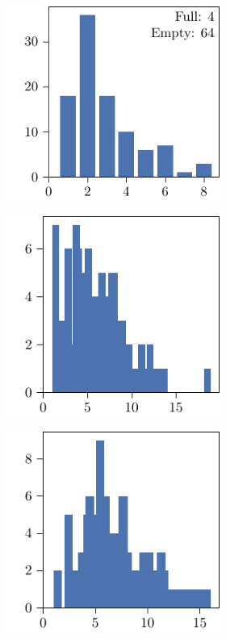 \begin{figure}[p]
\begin{subfigure}{\textwidth}
\begin{subfigure}{\mymultiouter}
          \includegraphics[width=\mymultiinner]{figures/new/relaxed_common-princess-permutation-retraining}
    \end{subfigure}
  \end{subfigure}
  \centering
  \begin{subfigure}{\textwidth}
    \centering
    \begin{subfigure}{\mymultiouter}
        \centering
          \includegraphics[width=\mymultiinner]{figures/new/eucledian-princess-qlibra-permutation}
    \end{subfigure}
    \begin{subfigure}{\mymultiouter}
        \centering
          \includegraphics[width=\mymultiinner]{figures/new/eucledian-princess-qlibra-retraining}

\end{subfigure}
\end{subfigure}
\end{figure}
